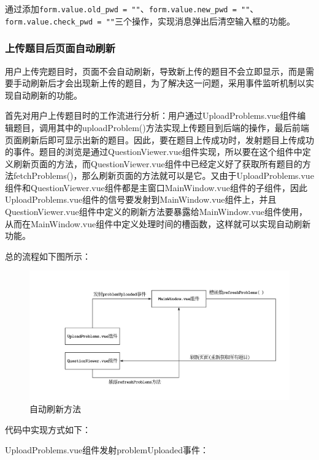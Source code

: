 \documentclass[a4paper,AutoFakeBold={2.7}]{ctexart} %
\begin{document}
通过添加\verb|form.value.old_pwd = ""|、\verb|form.value.new_pwd = ""|、\verb|form.value.check_pwd = ""|三个操作，实现消息弹出后清空输入框的功能。

\subsubsection{上传题目后页面自动刷新}

用户上传完题目时，页面不会自动刷新，导致新上传的题目不会立即显示，而是需要手动刷新后才会出现新上传的题目，为了解决这一问题，采用事件监听机制以实现自动刷新的功能。

首先对用户上传题目时的工作流进行分析：用户通过UploadProblems.vue组件编辑题目，调用其中的uploadProblem()方法实现上传题目到后端的操作，最后前端页面刷新后即可显示出新的题目。因此，要在题目上传成功时，发射题目上传成功的事件。题目的浏览是通过QuestionViewer.vue组件实现，所以要在这个组件中定义刷新页面的方法，而QuestionViewer.vue组件中已经定义好了获取所有题目的方法fetchProblems()，那么刷新页面的方法就可以是它。又由于UploadProblems.vue组件和QuestionViewer.vue组件都是主窗口MainWindow.vue组件的子组件，因此UploadProblems.vue组件的信号要发射到MainWindow.vue组件上，并且QuestionViewer.vue组件中定义的刷新方法要暴露给MainWindow.vue组件使用，从而在MainWindow.vue组件中定义处理时间的槽函数，这样就可以实现自动刷新功能。

总的流程如下图所示：

\begin{figure}[H]
    \centering
	\includegraphics[width=0.7\linewidth]{./图片/自动刷新方法.pdf}
	\caption{自动刷新方法}\label{自动刷新方法}
\end{figure}

代码中实现方式如下：

UploadProblems.vue组件发射problemUploaded事件：
\end{document}
